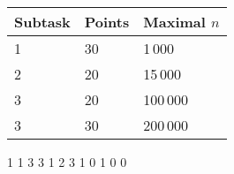 
\centering
\begin{tabular}{|l|l|l|}
\hline
Subtask & Points & Maximal $n$  \\ \hline
1       & 30     & 1\,000             \\ \hline
2       & 20     & 15\,000           \\ \hline
3       & 20     & 100\,000          \\ \hline
3       & 30     & 200\,000          \\ \hline
\end{tabular}


1 1 3 3
1 2 3 1
 0 1 0 0 

\sampleEND


